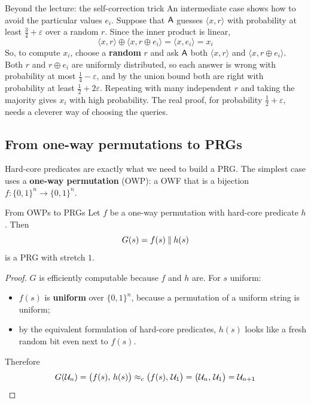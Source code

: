\begin{framedobs}{Beyond the lecture: the self-correction trick}
  An intermediate case shows how to avoid the particular values $e_i$. Suppose that $\mathsf{A}$ guesses $\langle x, r \rangle$ with probability at least $\frac{3}{4} + \varepsilon$ over a random $r$. Since the inner product is linear,
  \[
    \langle x, r \rangle \oplus \langle x, r \oplus e_i \rangle = \langle x, e_i \rangle = x_i
  \]
  So, to compute $x_i$, choose a \textbf{random} $r$ and ask $\mathsf{A}$ both $\langle x, r \rangle$ and $\langle x, r \oplus e_i \rangle$. Both $r$ and $r \oplus e_i$ are uniformly distributed, so each answer is wrong with probability at most $\frac{1}{4} - \varepsilon$, and by the union bound both are right with probability at least $\frac{1}{2} + 2\varepsilon$. Repeating with many independent $r$ and taking the majority gives $x_i$ with high probability. The real proof, for probability $\frac{1}{2} + \varepsilon$, needs a cleverer way of choosing the queries.
\end{framedobs}

\subsection{From one-way permutations to PRGs}

Hard-core predicates are exactly what we need to build a PRG. The simplest case uses a \textbf{one-way permutation} (OWP): a OWF that is a bijection $f : \{0,1\}^n \to \{0,1\}^n$.

\begin{framedprop}[label={prop:owp-prg}]{From OWPs to PRGs}
  Let $f$ be a one-way permutation with hard-core predicate $h$. Then
  \[
    G(s) = f(s) \mathbin{\Vert} h(s)
  \]
  is a PRG with stretch $1$.
\end{framedprop}

\begin{proof}
  $G$ is efficiently computable because $f$ and $h$ are. For $s$ uniform:
  \begin{itemize}
    \item $f(s)$ is \textbf{uniform} over $\{0,1\}^n$, because a permutation of a uniform string is uniform;
    \item by the equivalent formulation of hard-core predicates, $h(s)$ looks like a fresh random bit even next to $f(s)$.
  \end{itemize}
  Therefore
  \[
    G(\mathcal{U}_{n}) = \big(f(s),\, h(s)\big) \approx_c \big(f(s),\, \mathcal{U}_{1}\big) = \big(\mathcal{U}_{n},\, \mathcal{U}_{1}\big) = \mathcal{U}_{n+1} \qedhere
  \]
\end{proof}

